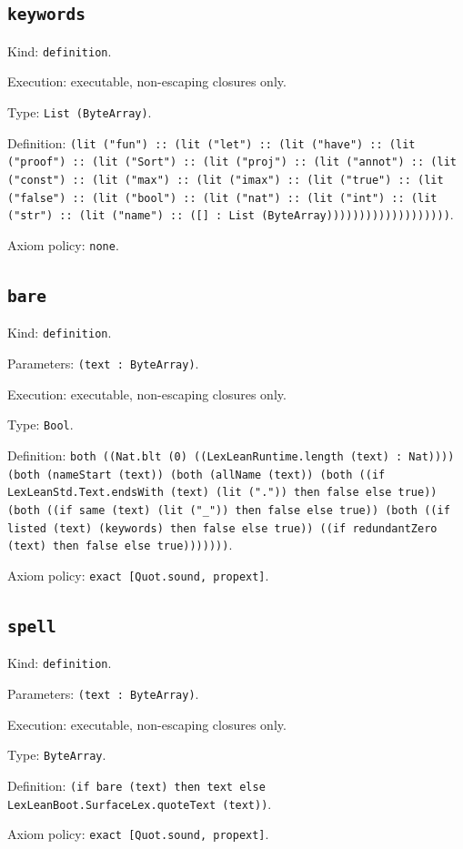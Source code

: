 \documentclass[11pt]{article}
\begin{document}
\subsection*{\texttt{keywords}}
\noindent Kind: \texttt{definition}.\par
\noindent Execution: executable, non-escaping closures only.\par
\noindent Type: \texttt{List (ByteArray)}.\par
\noindent Definition: \texttt{(lit ("fun") :: (lit ("let") :: (lit ("have") :: (lit ("proof") :: (lit ("Sort") :: (lit ("proj") :: (lit ("annot") :: (lit ("const") :: (lit ("max") :: (lit ("imax") :: (lit ("true") :: (lit ("false") :: (lit ("bool") :: (lit ("nat") :: (lit ("int") :: (lit ("str") :: (lit ("name") :: ([] : List (ByteArray)))))))))))))))))))}.\par
\noindent Axiom policy: \texttt{none}.\par
\subsection*{\texttt{bare}}
\noindent Kind: \texttt{definition}.\par
\noindent Parameters: \texttt{(text : ByteArray)}.\par
\noindent Execution: executable, non-escaping closures only.\par
\noindent Type: \texttt{Bool}.\par
\noindent Definition: \texttt{both ((Nat.blt (0) ((LexLeanRuntime.length (text) : Nat)))) (both (nameStart (text)) (both (allName (text)) (both ((if LexLeanStd.Text.endsWith (text) (lit (".")) then false else true)) (both ((if same (text) (lit ("\_")) then false else true)) (both ((if listed (text) (keywords) then false else true)) ((if redundantZero (text) then false else true)))))))}.\par
\noindent Axiom policy: \texttt{exact [Quot.sound, propext]}.\par
\subsection*{\texttt{spell}}
\noindent Kind: \texttt{definition}.\par
\noindent Parameters: \texttt{(text : ByteArray)}.\par
\noindent Execution: executable, non-escaping closures only.\par
\noindent Type: \texttt{ByteArray}.\par
\noindent Definition: \texttt{(if bare (text) then text else LexLeanBoot.SurfaceLex.quoteText (text))}.\par
\noindent Axiom policy: \texttt{exact [Quot.sound, propext]}.\par
\end{document}
